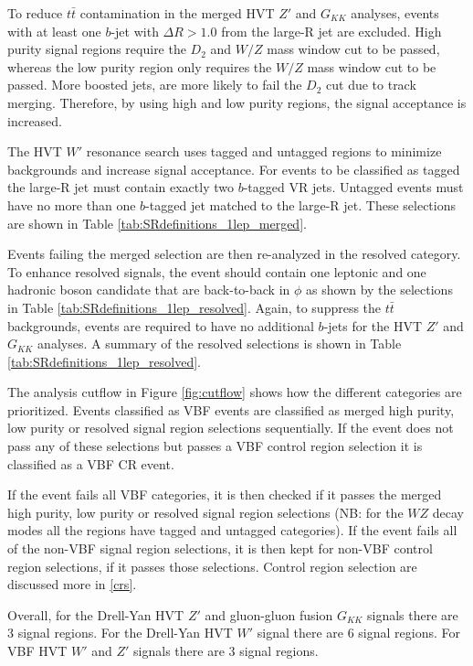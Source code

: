 To reduce $t\bar{t}$ contamination in the merged HVT $Z'$ and $G_{KK}$ analyses, events with at least one $b$-jet with $\Delta R > 1.0$ from the large-R jet are excluded. High purity signal regions require the $D_{2}$ and $W/Z$ mass window cut to be passed, whereas the low purity region only requires the  $W/Z$ mass window cut to be passed. More boosted jets, are more likely to fail the $D_{2}$ cut due to track merging. Therefore, by using high and low purity regions, the signal acceptance is increased. 

The HVT $W'$ resonance search uses tagged and untagged regions to minimize backgrounds and increase signal acceptance. For events to be classified as tagged the large-R jet must contain exactly two $b$-tagged VR jets. Untagged events must have no more than one $b$-tagged jet matched to the large-R jet. These selections are shown in Table \ref{tab:SRdefinitions_1lep_merged}. 

Events failing the merged selection are then re-analyzed in the resolved category. To enhance resolved signals, the event should contain one leptonic and one hadronic boson candidate that are back-to-back in $\phi$ as shown by the selections in Table \ref{tab:SRdefinitions_1lep_resolved}. Again, to suppress the $t\bar{t}$ backgrounds, events are required to have no additional $b$-jets for the HVT $Z'$ and $G_{KK}$ analyses. A summary of the resolved selections is shown in Table \ref{tab:SRdefinitions_1lep_resolved}.

The analysis cutflow in Figure \ref{fig:cutflow} shows how the different categories are prioritized. Events classified as VBF events are classified as merged high purity, low purity or resolved signal region selections sequentially. If the event does not pass any of these selections but passes a VBF control region selection it is classified as a VBF CR event. 

If the event fails all VBF categories, it is then checked if it passes the merged high purity, low purity or resolved signal region selections (NB: for the $WZ$ decay modes all the regions have tagged and untagged categories). If the event fails all of the non-VBF signal region selections, it is then kept for non-VBF control region selections, if it passes those selections. Control region selection are discussed more in \ref{crs}.

Overall, for the Drell-Yan HVT $Z'$ and gluon-gluon fusion $G_{KK}$ signals there are 3 signal regions. For the Drell-Yan HVT $W'$ signal there are 6 signal regions. For VBF HVT $W'$ and $Z'$ signals there are 3 signal regions.

